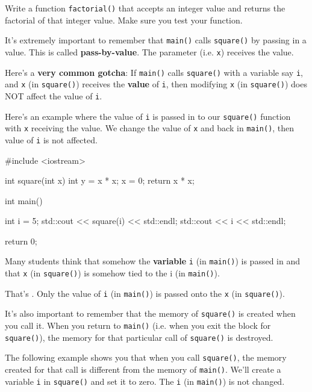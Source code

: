 \begin{ex}
Write a function \texttt{factorial()} that accepts an integer value and returns the factorial of that integer value. Make sure you test your function.
\end{ex}


\newpage{}

It's extremely important to remember that \texttt{main()} calls \texttt{square()} by passing in a value. This is called \textbf{pass-by-value}. The parameter (i.e. \texttt{x}) receives the value.

Here's a \textbf{very common gotcha}: If \texttt{main()} calls \texttt{square()} with a variable say \texttt{i}, and \texttt{x} (in \texttt{square()}) receives the \textbf{value} of \texttt{i}, then modifying \texttt{x} (in \texttt{square()}) does NOT affect the value of \texttt{i}.

Here's an example where the value of \texttt{i} is passed in to our \texttt{square()} function with \texttt{x} receiving the value. We change the value of \texttt{x} and back in \texttt{main()}, then value of \texttt{i} is not affected.

\begin{consolethree}[escapeinside=||]
#include <iostream>

int square(int x)
{
    int y = x * x;
    x = 0;
    return x * x;
}

int main()
{
    int i = 5;
    std::cout << square(i) << std::endl;
    std::cout << i << std::endl;

    return 0;
}
\end{consolethree}

Many students think that somehow the \textbf{variable} \texttt{i} (in \texttt{main()}) is passed in and that \texttt{x} (in \texttt{square()}) is somehow tied to the i (in \texttt{main()}).

That's . Only the value of \texttt{i} (in \texttt{main()}) is passed onto the \texttt{x} (in \texttt{square()}). 

It's also important to remember that the memory of \texttt{square()} is created when you call it. When you return to \texttt{main()} (i.e. when you exit the block for \texttt{square()}), the memory for that particular call of \texttt{square()} is destroyed.

The following example shows you that when you call \texttt{square()}, the memory created for that call is different from the memory of \texttt{main()}. We'll create a variable \texttt{i} in \texttt{square()} and set it to zero. The \texttt{i} (in \texttt{main()}) is not changed.

